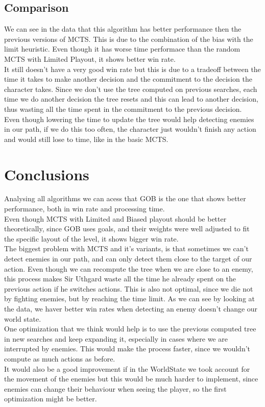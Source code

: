\documentclass{article}
\begin{document}
  \subsection{Comparison}
  We can see in the data that this algorithm has better performance then the previous versions of MCTS. This is due to the combination of the bias with the limit heuristic.
  Even though it has worse time performace than the random MCTS with Limited Playout, it shows better win rate. \\
  It still doesn't have a very good win rate but this is due to a tradeoff between the time it takes to make another decision and the commitment to the decision the
  character takes. Since we don't use the tree computed on previous searches, each time we do another decision the tree resets and this can lead to another decision,
  thus wasting all the time spent in the commitment to the previous decision.\\ 
  Even though lowering the time to update the tree would help detecting enemies in our path, if we do this too often, the character just wouldn't finish any action 
  and would still lose to time, like in the basic MCTS.\\

  \section{Conclusions}
  Analysing all algorithms we can acess that GOB is the one that shows better performance, both in win rate and processing time.\\
  Even though MCTS with Limited and Biased playout should be better theoretically, since GOB uses goals, and their weights were well adjusted to fit the 
  specific layout of the level, it shows bigger win rate.\\
  The biggest problem with MCTS and it's variants, is that sometimes we can't detect enemies in our path, and can only detect them close to the target of our action.
  Even though we can recompute the tree when we are close to an enemy, this process makes Sir Uthgard waste all the time he already spent on the previous action if he switches
  actions. This is also not optimal, since we die not by fighting enemies, but by reaching the time limit. As we can see by looking at the data,
  we haver better win rates when detecting an enemy doesn't change our world state. \\
  One optimization that we think would help is to use the previous computed tree in new searches and keep expanding it, especially in cases where we are interrupted by enemies. 
  This would make the process faster, since we wouldn't compute as much actions as before.\\
  It would also be a good improvement if in the WorldState we took account for the movement of the enemies but this would be much harder to implement, since enemies can
  change their behaviour when seeing the player, so the first optimization might be better.
\end{document}
